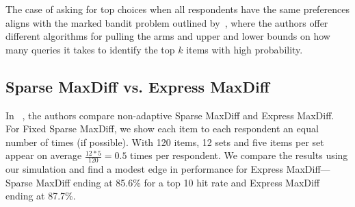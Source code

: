 \documentclass[nonblindrev]{informs3}
\begin{document}
\begin{APPENDICES}
The case of asking for top choices when all respondents have the same preferences aligns with the marked bandit problem outlined by~\cite{simchowitz2016best}, where the authors offer different algorithms for pulling the arms and upper and lower bounds on how many queries it takes to identify the top $k$ items with high probability. 


\subsection{Sparse MaxDiff vs. Express MaxDiff}
In ~\cite{wirth2012largeset}, the authors compare non-adaptive Sparse MaxDiff and Express MaxDiff. For Fixed Sparse MaxDiff, we show each item to each respondent an equal number of times (if possible). With 120 items, 12 sets and five items per set appear on average $\frac{12*5}{120} = 0.5$ times per respondent. We compare the results using our simulation and find a modest edge in performance for Express MaxDiff---Sparse MaxDiff ending at 85.6\% for a top 10 hit rate and Express MaxDiff ending at 87.7\%.

\end{APPENDICES}
\end{document}
